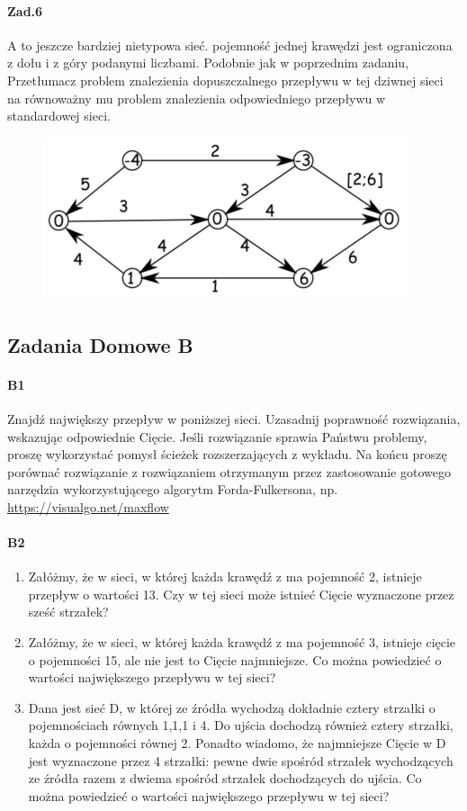 \documentclass[a4paper,12pt]{article}
\theoremstyle{definition}%
\theoremstyle{definition}
\theoremstyle{problem}
\begin{document}
\paragraph{Zad.6} A to jeszcze bardziej nietypowa sieć. pojemność jednej krawędzi jest ograniczona z dołu i z góry podanymi liczbami. Podobnie jak w poprzednim zadaniu, Przetłumacz problem znalezienia dopuszczalnego przepływu w tej dziwnej sieci na równoważny mu problem znalezienia odpowiedniego przepływu w standardowej sieci.
\begin{figure}[H]
\centering
\includegraphics[width=.8\textwidth]{img/6_Z6}
\end{figure}

\subsection{Zadania Domowe B}
\paragraph{B1} Znajdź największy przepływ w poniższej sieci. Uzasadnij poprawność rozwiązania, wskazując odpowiednie Cięcie.
Jeśli rozwiązanie sprawia Państwu problemy, proszę  wykorzystać pomysł ścieżek rozszerzających z wykładu.
Na końcu proszę porównać rozwiązanie z rozwiązaniem otrzymanym przez zastosowanie gotowego narzędzia wykorzystującego algorytm Forda-Fulkersona, np. \url{https://visualgo.net/maxflow}

\paragraph{B2}
\begin{enumerate}[label=\alph*)]
\item Załóżmy, że w sieci, w której każda krawędź z ma pojemność 2, istnieje przepływ o wartości 13. Czy w tej sieci może istnieć Cięcie wyznaczone przez sześć strzałek?
\item Załóżmy, że w sieci, w której każda krawędź z ma pojemność 3, istnieje cięcie o pojemności 15, ale nie jest to Cięcie najmniejsze. Co można powiedzieć o wartości największego przepływu w tej sieci?
\item Dana jest sieć D, w której ze źródła wychodzą dokładnie cztery strzałki o pojemnościach równych 1,1,1 i 4. Do ujścia dochodzą również cztery strzałki, każda o pojemności równej 2. Ponadto wiadomo, że najmniejsze Cięcie w D jest wyznaczone przez 4 strzałki: pewne dwie spośród strzałek wychodzących ze źródła razem z dwiema spośród strzałek dochodzących do ujścia.
Co można powiedzieć o wartości największego przepływu w tej sieci?
\end{enumerate}
\end{document}

